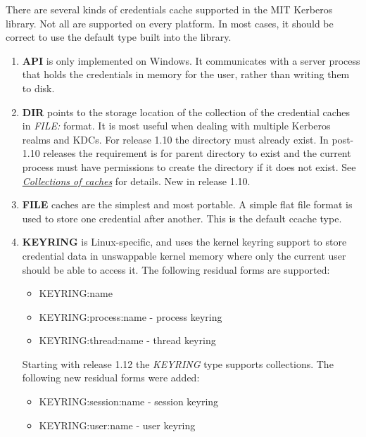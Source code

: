 \documentclass[letterpaper,10pt,english]{sphinxmanual}
\begin{document}
There are several kinds of credentials cache supported in the MIT
Kerberos library.  Not all are supported on every platform.  In most
cases, it should be correct to use the default type built into the
library.
\begin{enumerate}
\item {} 
\textbf{API} is only implemented on Windows.  It communicates with a
server process that holds the credentials in memory for the user,
rather than writing them to disk.

\item {} 
\textbf{DIR} points to the storage location of the collection of the
credential caches in \emph{FILE:} format. It is most useful when dealing
with multiple Kerberos realms and KDCs.  For release 1.10 the
directory must already exist.  In post-1.10 releases the
requirement is for parent directory to exist and the current
process must have permissions to create the directory if it does
not exist. See {\hyperref[basic/ccache_def:col-ccache]{\emph{Collections of caches}}} for details.  New in release 1.10.

\item {} 
\textbf{FILE} caches are the simplest and most portable. A simple flat
file format is used to store one credential after another.  This is
the default ccache type.

\item {} 
\textbf{KEYRING} is Linux-specific, and uses the kernel keyring support
to store credential data in unswappable kernel memory where only
the current user should be able to access it.  The following
residual forms are supported:
\begin{itemize}
\item {} 
KEYRING:name

\item {} 
KEYRING:process:name - process keyring

\item {} 
KEYRING:thread:name -  thread keyring

\end{itemize}

Starting with release 1.12 the \emph{KEYRING} type supports collections.
The following new residual forms were added:
\begin{itemize}
\item {} 
KEYRING:session:name - session keyring

\item {} 
KEYRING:user:name - user keyring


\end{itemize}
\end{enumerate}
\end{document}
